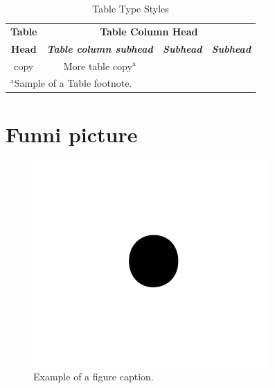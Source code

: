 \documentclass[conference]{IEEEtran}
\begin{document}
\begin{table}[htbp]
\caption{Table Type Styles}
\begin{center}
\begin{tabular}{|c|c|c|c|}
\hline
\textbf{Table}&\multicolumn{3}{|c|}{\textbf{Table Column Head}} \\
\cline{2-4} 
\textbf{Head} & \textbf{\textit{Table column subhead}}& \textbf{\textit{Subhead}}& \textbf{\textit{Subhead}} \\
\hline
copy& More table copy$^{\mathrm{a}}$& &  \\
\hline
\multicolumn{4}{l}{$^{\mathrm{a}}$Sample of a Table footnote.}
\end{tabular}
\label{tab1}
\end{center}
\end{table}

\section{Funni picture}

\begin{figure}[htbp]
\centerline{\includegraphics{fig1.png}}
\caption{Example of a figure caption.}
\label{fig}
\end{figure}
\end{document}

